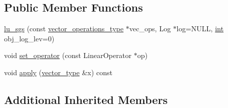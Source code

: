 \subsection*{Public Member Functions}
\begin{DoxyCompactItemize}
\item 
\hyperlink{classnumerical__algos_1_1lin__solvers_1_1lu__sgs_a4d45c37590db5f0ad48875ddfdf24125}{lu\-\_\-sgs} (const \hyperlink{classnumerical__algos_1_1lin__solvers_1_1lu__sgs_ac92691bd7442a226c10fab88f4f5fd0d}{vector\-\_\-operations\-\_\-type} $\ast$vec\-\_\-ops, Log $\ast$log=N\-U\-L\-L, \hyperlink{classint}{int} obj\-\_\-log\-\_\-lev=0)
\item 
void \hyperlink{classnumerical__algos_1_1lin__solvers_1_1lu__sgs_ac215ea0570c177011b7f34de3353f2c2}{set\-\_\-operator} (const Linear\-Operator $\ast$op)
\item 
void \hyperlink{classnumerical__algos_1_1lin__solvers_1_1lu__sgs_ae8205ac51bc28abe170ccc12ef756b5c}{apply} (\hyperlink{classnumerical__algos_1_1lin__solvers_1_1lu__sgs_ac04dfa258dce932c55628e33aa5cf09e}{vector\-\_\-type} \&x) const 
\end{DoxyCompactItemize}
\subsection*{Additional Inherited Members}


